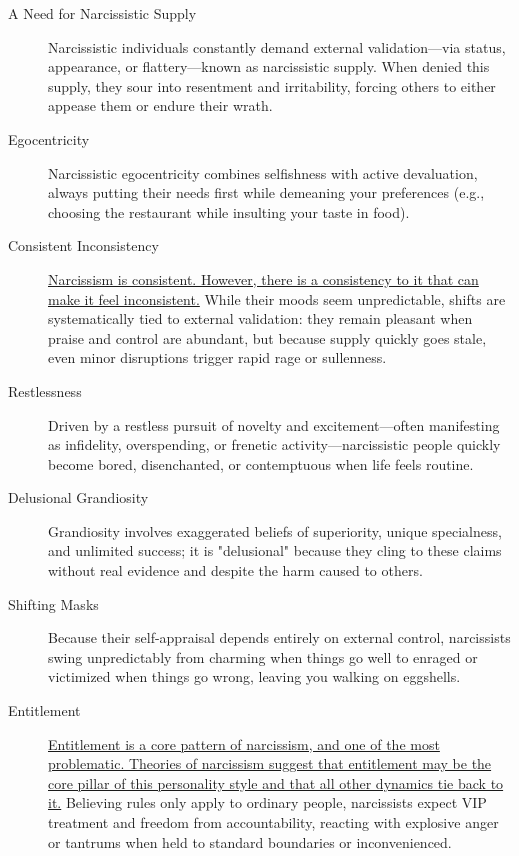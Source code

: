 \documentclass[11pt,letter]{article}
\begin{document}
\begin{description}

\item[A Need for Narcissistic Supply]
Narcissistic individuals constantly demand external validation—via status,
appearance, or flattery—known as narcissistic supply. When denied this supply,
they sour into resentment and irritability, forcing others to either appease
them or endure their wrath.

\item[Egocentricity]
Narcissistic egocentricity combines selfishness with active devaluation, always
putting their needs first while demeaning your preferences (e.g., choosing the
restaurant while insulting your taste in food).

\item[Consistent Inconsistency]
\ul{Narcissism is consistent. However, there is a consistency to it that can make
it feel inconsistent.}
While their moods seem unpredictable, shifts are systematically tied to external
validation: they remain pleasant when praise and control are abundant, but
because supply quickly goes stale, even minor disruptions trigger rapid rage or
sullenness.

\item[Restlessness]
Driven by a restless pursuit of novelty and excitement—often manifesting as
infidelity, overspending, or frenetic activity—narcissistic people quickly
become bored, disenchanted, or contemptuous when life feels routine.

\item[Delusional Grandiosity]
Grandiosity involves exaggerated beliefs of superiority, unique specialness, and
unlimited success; it is "delusional" because they cling to these claims without
real evidence and despite the harm caused to others.

\item[Shifting Masks]
Because their self-appraisal depends entirely on external control, narcissists
swing unpredictably from charming when things go well to enraged or victimized
when things go wrong, leaving you walking on eggshells.

\item[Entitlement]
\ul{Entitlement is a core pattern of narcissism, and one of the most problematic.
Theories of narcissism suggest that entitlement may be the core pillar of this
personality style and that all other dynamics tie back to it.}
Believing rules only apply to ordinary people, narcissists expect VIP treatment
and freedom from accountability, reacting with explosive anger or tantrums when
held to standard boundaries or inconvenienced.


\end{description}
\end{document}
